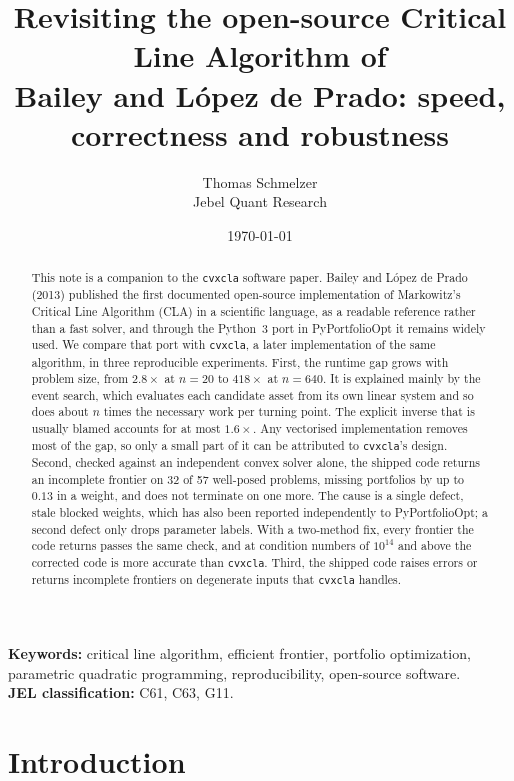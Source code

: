 \documentclass[11pt,a4paper]{article}
\title{Revisiting the open-source Critical Line Algorithm of\\
  Bailey and López de Prado: speed, correctness and robustness}
\author{Thomas Schmelzer\\
  \small Jebel Quant Research\\
  \small\href{mailto:thomas.schmelzer@gmail.com}{\code{thomas.schmelzer@gmail.com}}}
\date{\today}
\newcommand{\code}[1]{\texttt{#1}}
\newcommand{\cvxcla}{\code{cvxcla}}
\begin{document}
\maketitle

\begin{abstract}
  This note is a companion to the \cvxcla{} software paper. Bailey and López
  de Prado (2013) published the first documented open-source implementation of
  Markowitz's Critical Line Algorithm (CLA) in a scientific language, as a
  readable reference rather than a fast solver, and through the Python~3 port
  in PyPortfolioOpt it remains widely used. We compare that port with
  \cvxcla{}, a later implementation of the same algorithm, in three
  reproducible experiments. First, the runtime gap grows with problem
  size, from $2.8\times$ at $n = 20$ to $418\times$ at $n = 640$. It is
  explained mainly by the event search, which evaluates each candidate asset
  from its own linear system and so does about $n$ times the necessary work
  per turning point. The explicit inverse that is usually blamed accounts for
  at most $1.6\times$. Any vectorised implementation removes most of the gap,
  so only a small part of it can be attributed to \cvxcla{}'s design. Second,
  checked against an independent convex solver alone, the shipped code returns
  an incomplete frontier on 32 of 57 well-posed problems, missing portfolios by
  up to $0.13$ in a weight, and does not terminate on one more. The cause is a
  single defect, stale blocked weights, which has also been reported
  independently to PyPortfolioOpt; a second defect only drops parameter
  labels. With a two-method fix, every frontier the code returns passes the
  same check, and at condition numbers of $10^{14}$ and above the corrected
  code is more accurate than \cvxcla{}. Third, the shipped code raises errors
  or returns incomplete frontiers on degenerate inputs that \cvxcla{} handles.
\end{abstract}

\begin{flushleft}
  \textbf{Keywords:} critical line algorithm, efficient frontier, portfolio
  optimization, parametric quadratic programming, reproducibility, open-source
  software.\\
  \textbf{JEL classification:} C61, C63, G11.
\end{flushleft}

\section{Introduction}
\end{document}
